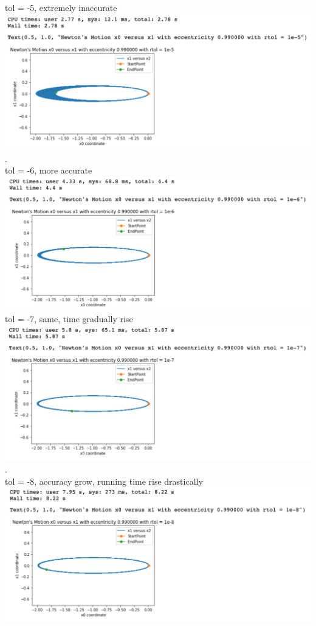 \documentclass[11pt]{article}
\begin{document}
tol = -5, extremely inaccurate\\
\includegraphics[scale = 0.8]{5}\newpage .\\
tol = -6, more accurate\\
\includegraphics[scale = 0.8]{6}
tol = -7, same, time gradually rise\\
\includegraphics[scale = 0.8]{7.png}\newpage .\\
tol = -8, accuracy grow, running time rise drastically\\
\includegraphics[scale = 0.8]{8}
\end{document}
